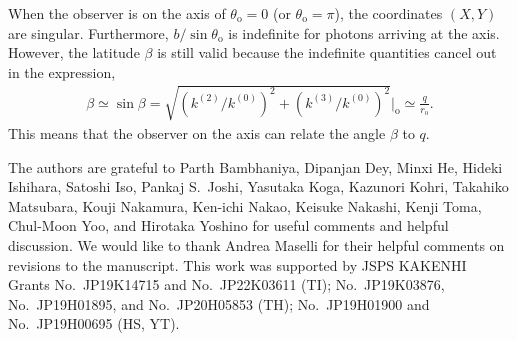 \documentclass[aps,11pt,nofootinbib,preprintnumbers,groupedaddress,superscriptaddress]{revtex4-2}
\begin{document}
When the observer is on the axis of $\theta_{\mathrm{o}}=0$ (or $\theta_{\mathrm{o}}=\pi$), 
the coordinates $(X,Y)$ are singular. 
Furthermore, $b/\sin \theta_{\mathrm{o}}$ is indefinite for photons arriving at the axis. 
However, the latitude $\beta$ is still valid because the indefinite quantities cancel out in the expression, 
\begin{align}
\beta\simeq \sin\beta =\sqrt{(k^{(2)}/k^{(0)})^2+(k^{(3)}/k^{(0)})^2}\Big|_{\mathrm{o}}\simeq \frac{q}{r_{\mathrm{o}}}.
\end{align}
This means that the observer on the axis can relate the angle $\beta$ to $q$. 




\begin{acknowledgments}
The authors are grateful to Parth Bambhaniya, Dipanjan Dey, Minxi He, 
Hideki Ishihara, Satoshi Iso, Pankaj S.~Joshi, Yasutaka Koga, Kazunori Kohri, Takahiko Matsubara, Kouji Nakamura, Ken-ichi Nakao, Keisuke Nakashi, Kenji Toma, Chul-Moon Yoo, and Hirotaka Yoshino for useful comments and helpful discussion. 
We would like to thank Andrea Maselli for their helpful comments on revisions to the manuscript. 
This work was supported by JSPS KAKENHI Grants No.~JP19K14715 and No.~JP22K03611 (TI); 
No.~JP19K03876, No.~JP19H01895, and No.~JP20H05853 (TH); No.~JP19H01900 and No.~JP19H00695 (HS, YT).
\end{acknowledgments}
\end{document}
